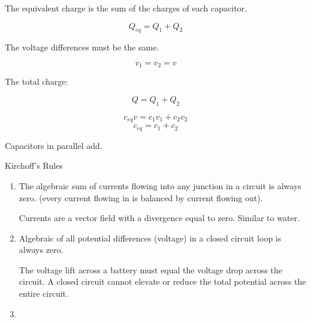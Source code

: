 \documentclass{report}
\begin{document}
\begin{description}
\begin{mdframed}
            The equivalent charge is the sum of the charges
            of each capacitor.

            \begin{displaymath}
                Q_{eq} = Q_1 + Q_2
            \end{displaymath}

            The voltage differences must be the same.

            \begin{displaymath}
                v_1 = v_2 = v
            \end{displaymath}

            The total charge:

            \begin{displaymath}
                Q = Q_1 + Q_2
            \end{displaymath}
            
            \begin{displaymath}
                c_{eq} v = c_1v_1 +c_2v_2                 
            \end{displaymath}
            \begin{displaymath}
                c_{eq} = c_1 + c_2
            \end{displaymath}
            
            Capacitors in parallel add. 
        \end{mdframed}
    \item {\large Kirchoff's Rules}
        \begin{mdframed}
           \begin{enumerate}
               \item The algebraic sum of currents flowing
                   into any junction in a circuit
                   is always zero. (every current flowing
                   in is balanced by current flowing out).
                   \begin{mdframed}
                       Currents are a vector field with
                       a divergence equal to zero. Similar
                       to water.
                   \end{mdframed}
               \item Algebraic of all potential differences
                   (voltage) in a closed circuit loop
                   is always zero.
                   \begin{mdframed}
                       The voltage lift across a battery
                       must equal the voltage drop across
                       the circuit. A closed circuit cannot
                        elevate or reduce the total
                        potential across the entire circuit.
                   \end{mdframed}
               \item 
           \end{enumerate}  
        \end{mdframed}
\end{description}
\end{document}
